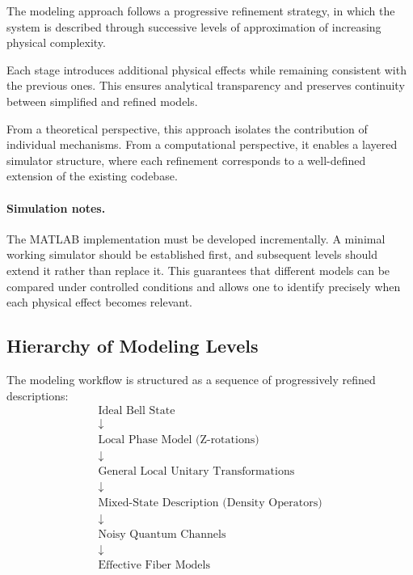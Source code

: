 \documentclass[a4paper]{article}
\begin{document}
The modeling approach follows a progressive refinement strategy, in which the system is described through successive levels of approximation of increasing physical complexity.

Each stage introduces additional physical effects while remaining consistent with the previous ones. This ensures analytical transparency and preserves continuity between simplified and refined models.

From a theoretical perspective, this approach isolates the contribution of individual mechanisms. From a computational perspective, it enables a layered simulator structure, where each refinement corresponds to a well-defined extension of the existing codebase.

\paragraph{Simulation notes.}
The MATLAB implementation must be developed incrementally. A minimal working simulator should be established first, and subsequent levels should extend it rather than replace it. This guarantees that different models can be compared under controlled conditions and allows one to identify precisely when each physical effect becomes relevant.


\subsection{Hierarchy of Modeling Levels}

The modeling workflow is structured as a sequence of progressively refined descriptions:
\[
\begin{array}{c}
\text{Ideal Bell State} \\
\downarrow \\
\text{Local Phase Model (Z-rotations)} \\
\downarrow \\
\text{General Local Unitary Transformations} \\
\downarrow \\
\text{Mixed-State Description (Density Operators)} \\
\downarrow \\
\text{Noisy Quantum Channels} \\
\downarrow \\
\text{Effective Fiber Models}
\end{array}
\]
\end{document}
